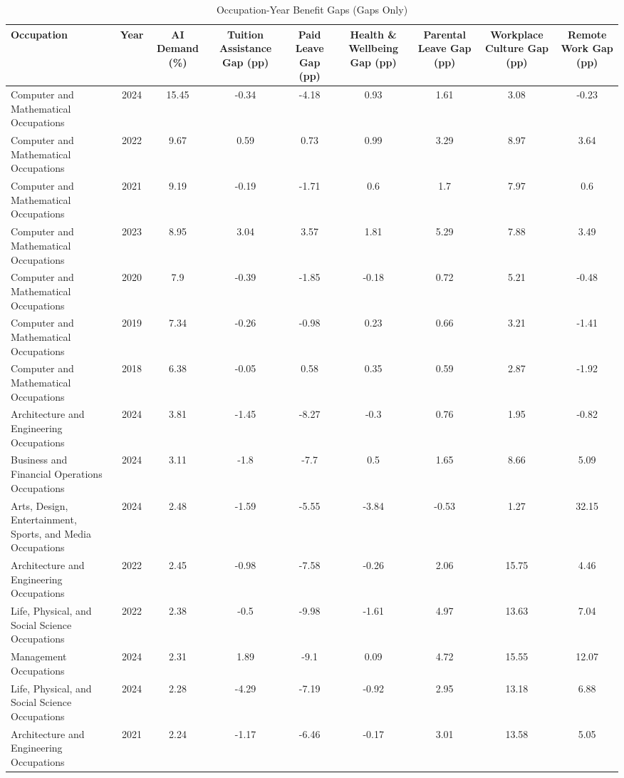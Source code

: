 \begin{table}[htbp]
\caption{Occupation-Year Benefit Gaps (Gaps Only)}
\label{tab:benefit_gaps_concise}
\begin{tabular}{lcccccccc}
\hline\hline
Occupation & Year & AI Demand (\%) & Tuition Assistance Gap (pp) & Paid Leave Gap (pp) & Health \& Wellbeing Gap (pp) & Parental Leave Gap (pp) & Workplace Culture Gap (pp) & Remote Work Gap (pp) \\
\hline
Computer and Mathematical Occupations & 2024 & 15.45 & -0.34 & -4.18 & 0.93 & 1.61 & 3.08 & -0.23 \\
Computer and Mathematical Occupations & 2022 & 9.67 & 0.59 & 0.73 & 0.99 & 3.29 & 8.97 & 3.64 \\
Computer and Mathematical Occupations & 2021 & 9.19 & -0.19 & -1.71 & 0.6 & 1.7 & 7.97 & 0.6 \\
Computer and Mathematical Occupations & 2023 & 8.95 & 3.04 & 3.57 & 1.81 & 5.29 & 7.88 & 3.49 \\
Computer and Mathematical Occupations & 2020 & 7.9 & -0.39 & -1.85 & -0.18 & 0.72 & 5.21 & -0.48 \\
Computer and Mathematical Occupations & 2019 & 7.34 & -0.26 & -0.98 & 0.23 & 0.66 & 3.21 & -1.41 \\
Computer and Mathematical Occupations & 2018 & 6.38 & -0.05 & 0.58 & 0.35 & 0.59 & 2.87 & -1.92 \\
Architecture and Engineering Occupations & 2024 & 3.81 & -1.45 & -8.27 & -0.3 & 0.76 & 1.95 & -0.82 \\
Business and Financial Operations Occupations & 2024 & 3.11 & -1.8 & -7.7 & 0.5 & 1.65 & 8.66 & 5.09 \\
Arts, Design, Entertainment, Sports, and Media Occupations & 2024 & 2.48 & -1.59 & -5.55 & -3.84 & -0.53 & 1.27 & 32.15 \\
Architecture and Engineering Occupations & 2022 & 2.45 & -0.98 & -7.58 & -0.26 & 2.06 & 15.75 & 4.46 \\
Life, Physical, and Social Science Occupations & 2022 & 2.38 & -0.5 & -9.98 & -1.61 & 4.97 & 13.63 & 7.04 \\
Management Occupations & 2024 & 2.31 & 1.89 & -9.1 & 0.09 & 4.72 & 15.55 & 12.07 \\
Life, Physical, and Social Science Occupations & 2024 & 2.28 & -4.29 & -7.19 & -0.92 & 2.95 & 13.18 & 6.88 \\
Architecture and Engineering Occupations & 2021 & 2.24 & -1.17 & -6.46 & -0.17 & 3.01 & 13.58 & 5.05 \\

\end{tabular}
\end{table}
